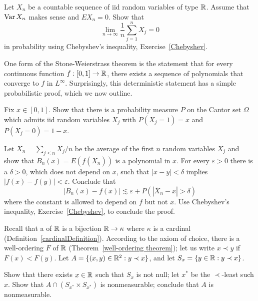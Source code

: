 \begin{exercise}
Let $X_{n}$ be a countable sequence of iid random variables of type $\mathbb{R}$.
Assume that $\operatorname{Var} X_{n}$ makes sense and $EX_{n} = 0$. Show that
\[\lim_{n \to \infty} \frac{1}{n} \sum_{j=1}^{n} X_{j} = 0\]
in probability using Chebyshev's inequality, Exercise~\ref{Chebyshev}.
\end{exercise}

\begin{exercise}
One form of the Stone-Weierstrass theorem is the statement that for every continuous function $f: [0, 1] \to \mathbb{R}$, there exists a sequence of polynomials that converge to $f$ in $L^{\infty}$.
Surprisingly, this deterministic statement has a simple probabilistic proof, which we now outline.

Fix $x \in [0, 1]$.
Show that there is a probability measure $P$ on the Cantor set $\Omega$ which admits iid random variables $X_{j}$ with $P(X_{j} = 1) = x$ and $P(X_{j} = 0) = 1 - x$.

Let $\overline X_{n} = \sum_{j \leq n} X_{j}/n$ be the average of the first $n$ random variables $X_{j}$ and show that $B_{n}(x) = E(f(\overline X_{n}))$ is a polynomial in $x$.
For every $\varepsilon > 0$ there is a $\delta > 0$, which does not depend on $x$, such that $|x - y| < \delta$ implies $|f(x) - f(y)| < \varepsilon$.
Conclude that
\[|B_{n}(x) - f(x)| \lesssim \varepsilon + P(|\overline X_{n} - x| > \delta)\]
where the constant is allowed to depend on $f$ but not $x$.
Use Chebyshev's inequality, Exercise~\ref{Chebyshev}, to conclude the proof.
\end{exercise}

\begin{exercise}
Recall that a  of $\mathbb{R}$ is a bijection $\mathbb{R} \to \kappa$ where $\kappa$ is a cardinal (Definition~\ref{cardinalDefinition}).
According to the axiom of choice, there is a well-ordering $F$ of $\mathbb{R}$ (Theorem~\ref{well-ordering theorem}); let us write $x \prec y$ if $F(x) < F(y)$.
Let $A = \{(x, y) \in \mathbb{R}^2: y \prec x\}$, and let $S_x = \{y \in \mathbb{R}: y \prec x\}$.

Show that there exists $x \in \mathbb{R}$ such that $S_x$ is not null; let $x^*$ be the $\prec$-least such $x$.
Show that $A \cap (S_{x^*} \times S_{x^*})$ is nonmeasurable; conclude that $A$ is nonmeasurable.
\end{exercise}
